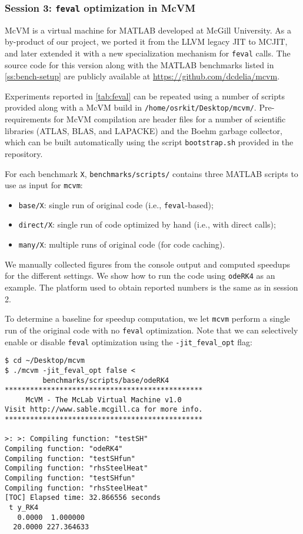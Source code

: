 
\subsubsection{Session 3: {\tt feval} optimization in McVM}

McVM is a virtual machine for MATLAB developed at McGill University. As a by-product of our project, we ported it from the LLVM legacy JIT to MCJIT, and later extended it with a new specialization mechanism for {\tt feval} calls. The source code for this version along with the MATLAB benchmarks listed in \mysection\ref{ss:bench-setup} are publicly available at \url{https://github.com/dcdelia/mcvm}.

Experiments reported in \mytable\ref{tab:feval} can be repeated using a number of scripts provided along with a McVM build in {\small\tt /home/osrkit/Desktop/mcvm/}. Pre-requirements for McVM compilation are header files for a number of scientific libraries (ATLAS, BLAS, and LAPACKE) and the Boehm garbage collector, which can be built automatically using the script {\tt bootstrap.sh} provided in the repository.

For each benchmark {\tt X}, {\small\tt benchmarks/scripts/} contains three MATLAB scripts to use as input for {\tt mcvm}:

\begin{itemize}[parsep=0pt]
\item {\tt base/X}: single run of original code (i.e., {\tt feval}-based);
\item {\tt direct/X}: single run of code optimized by hand (i.e., with direct calls);
\item {\tt many/X}: multiple runs of original code (for code caching).
\end{itemize}

\noindent We manually collected figures from the console output and computed speedups for the different settings. We show how to run the code using {\tt odeRK4} as an example. The platform used to obtain reported numbers is the same as in session 2.

To determine a baseline for speedup computation, we let {\tt mcvm} perform a single run of the original code with no {\tt feval} optimization. Note that we can selectively enable or disable {\tt feval} optimization using the {\tt -jit\_feval\_opt} flag:

\begin{small}
\begin{verbatim}
$ cd ~/Desktop/mcvm
$ ./mcvm -jit_feval_opt false <
         benchmarks/scripts/base/odeRK4
***********************************************
     McVM - The McLab Virtual Machine v1.0
Visit http://www.sable.mcgill.ca for more info.
***********************************************

>: >: Compiling function: "testSH"
Compiling function: "odeRK4"
Compiling function: "testSHfun"
Compiling function: "rhsSteelHeat"
Compiling function: "testSHfun"
Compiling function: "rhsSteelHeat"
[TOC] Elapsed time: 32.866556 seconds
 t y_RK4
   0.0000  1.000000
  20.0000 227.364633
\end{verbatim}
\end{small}

